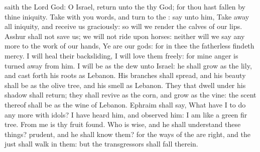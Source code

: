  saith the Lord God: O Israel, return unto the  thy God; for thou hast fallen by thine iniquity. Take with you words, and turn to the : say unto him, Take away all iniquity, and receive us graciously: so will we render the calves of our lips. Asshur shall not save us; we will not ride upon horses: neither will we say any more to the work of our hands, Ye are our gods: for in thee the fatherless findeth mercy. I will heal their backsliding, I will love them freely: for mine anger is turned away from him. I will be as the dew unto Israel: he shall grow as the lily, and cast forth his roots as Lebanon. His branches shall spread, and his beauty shall be as the olive tree, and his smell as Lebanon. They that dwell under his shadow shall return; they shall revive as the corn, and grow as the vine: the scent thereof shall be as the wine of Lebanon. Ephraim shall say, What have I to do any more with idols? I have heard him, and observed him: I am like a green fir tree. From me is thy fruit found. Who is wise, and he shall understand these things? prudent, and he shall know them? for the ways of the  are right, and the just shall walk in them: but the transgressors shall fall therein.

